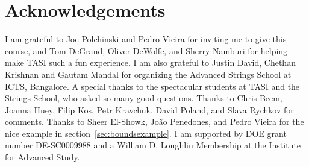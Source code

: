 \documentclass[11pt]{ws-rv9x6}
\newcommand\<\langle
\renewcommand\>\rangle
\renewcommand\.{\cdot}
\begin{document}
\section*{Acknowledgements}

I am grateful to Joe Polchinski and Pedro Vieira for inviting me to give this course, and Tom DeGrand, Oliver DeWolfe, and Sherry Namburi for helping make TASI such a fun experience.  I am also grateful to Justin David, Chethan Krishnan and Gautam Mandal for organizing the Advanced Strings School at ICTS, Bangalore.  A special thanks to the spectacular students at TASI and the Strings School, who asked so many good questions.  Thanks to Chris Beem, Joanna Huey, Filip Kos, Petr Kravchuk, David Poland, and Slava Rychkov for comments.  Thanks to Sheer El-Showk, Jo\~ao Penedones, and Pedro Vieira for the nice example in section~\ref{sec:boundsexample}. I am supported by DOE grant number DE-SC0009988 and a William D. Loughlin Membership at the Institute for Advanced Study.
\end{document}

